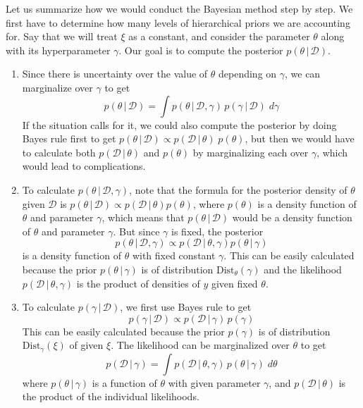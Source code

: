  Let us summarize how we would conduct the Bayesian method step by step. We first have to determine how many levels of hierarchical priors we are accounting for. Say that we will treat $\xi$ as a constant, and consider the parameter $\theta$ along with its hyperparameter $\gamma$. Our goal is to compute the posterior $p(\theta\,|\,\mathcal{D})$.

  \begin{enumerate}
    \item Since there is uncertainty over the value of $\theta$ depending on $\gamma$, we can marginalize over $\gamma$ to get
    \begin{equation}
      p(\theta\,|\,\mathcal{D}) = \int p(\theta\,|\,\mathcal{D}, \gamma)\, p(\gamma\,|\,\mathcal{D})\; d\gamma
    \end{equation}
    If the situation calls for it, we could also compute the posterior by doing Bayes rule first to get $p(\theta\,|\,\mathcal{D}) \propto p(\mathcal{D}\,|\,\theta)\; p(\theta)$, but then we would have to calculate both $p(\mathcal{D}\,|\,\theta)$ and $p(\theta)$ by marginalizing each over $\gamma$, which would lead to complications.

    \item To calculate $p(\theta\,|\,\mathcal{D}, \gamma)$, note that the formula for the posterior density of $\theta$ given $\mathcal{D}$ is $p(\theta\,|\,\mathcal{D}) \propto p(\mathcal{D}\,|\,\theta) p(\theta)$, where $p(\theta)$ is a density function of $\theta$ and parameter $\gamma$, which means that $p(\theta\,|\,\mathcal{D})$ would be a density function of $\theta$ and parameter $\gamma$. But since $\gamma$ is fixed, the posterior
    \begin{equation}
      p(\theta\,|\,\mathcal{D}, \gamma) \propto p(\mathcal{D}\,|\,\theta, \gamma) p(\theta\,|\,\gamma)
    \end{equation}
    is a density function of $\theta$ with fixed constant $\gamma$. This can be easily calculated because the prior $p(\theta\,|\,\gamma)$ is of distribution $\text{Dist}_\theta (\gamma)$ and the likelihood $p(\mathcal{D}\,|\,\theta, \gamma)$ is the product of densities of $y$ given fixed $\theta$.

    \item To calculate $p(\gamma\,|\,\mathcal{D})$, we first use Bayes rule to get
    \begin{equation}
      p(\gamma\,|\,\mathcal{D}) \propto p(\mathcal{D}\,|\,\gamma)\, p(\gamma)
    \end{equation}
    This can be easily calculated because the prior $p(\gamma)$ is of distribution $\text{Dist}_\gamma (\xi)$ of given $\xi$. The likelihood can be marginalized over $\theta$ to get
    \begin{equation}
      p(\mathcal{D}\,|\,\gamma) = \int p(\mathcal{D}\,|\,\theta, \gamma)\, p(\theta\,|\, \gamma)\; d\theta
    \end{equation}
    where $p(\theta\,|\,\gamma)$ is a function of $\theta$ with given parameter $\gamma$, and $p(\mathcal{D}\,|\,\theta)$ is the product of the individual likelihoods.
  \end{enumerate}

